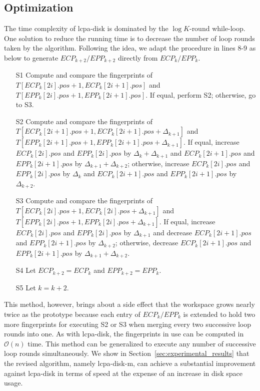 \documentclass[10pt,journal,compsoc]{IEEEtran}
\begin{document}
\begin{CJK*}{GBK}{song}
\subsection{Optimization}\label{subsec:optimization}
The time complexity of lcpa-disk is dominated by the $\log K$-round while-loop. One solution to reduce the running time is to decrease the number of loop rounds taken by the algorithm. Following the idea, we adapt the procedure in lines 8-9 as below to generate $ECP_{k+2}/EPP_{k+2}$ directly from $ECP_k/EPP_k$.

\begin{enumerate}
\item[S1] Compute and compare the fingerprints of $T[ECP_k[2i].pos+1,ECP_k[2i+1].pos]$ and $T[EPP_k[2i].pos+1,EPP_k[2i+1].pos]$. If equal, perform S2; otherwise, go to S3.
\item[S2] Compute and compare the fingerprints of $T[ECP_k[2i+1].pos+1,ECP_k[2i+1].pos+\Delta_{k+1}]$ and $T[EPP_k[2i+1].pos+1,EPP_k[2i+1].pos+\Delta_{k+1}]$. If equal, increase $ECP_k[2i].pos$ and $EPP_k[2i].pos$ by $\Delta_{k}+\Delta_{k+1}$ and $ECP_k[2i+1].pos$ and $EPP_k[2i+1].pos$ by $\Delta_{k+1}+\Delta_{k+2}$; otherwise, increase $ECP_k[2i].pos$ and $EPP_k[2i].pos$ by $\Delta_{k}$ and $ECP_k[2i+1].pos$ and $EPP_k[2i+1].pos$ by $\Delta_{k+2}$.
\item[S3] Compute and compare the fingerprints of $T[ECP_k[2i].pos+1,ECP_k[2i].pos+\Delta_{k+1}]$ and $T[EPP_k[2i].pos+1,EPP_k[2i].pos+\Delta_{k+1}]$. If equal, increase $ECP_k[2i].pos$ and $EPP_k[2i].pos$ by $\Delta_{k+1}$ and decrease $ECP_k[2i+1].pos$ and $EPP_k[2i+1].pos$ by $\Delta_{k+2}$; otherwise, decrease $ECP_k[2i+1].pos$ and $EPP_k[2i+1].pos$ by $\Delta_{k+1}+\Delta_{k+2}$.
\item[S4] Let $ECP_{k+2}=ECP_{k}$ and $EPP_{k+2}=EPP_{k}$.
\item[S5] Let $k = k+2$.
\end{enumerate}

This method, however, brings about a side effect that the workspace grows nearly twice as the prototype because each entry of $ECP_k/EPP_k$ is extended to hold two more fingerprints for executing S2 or S3 when merging every two successive loop rounds into one. As with lcpa-disk, the fingerprints in use can be computed in $\mathcal{O}(n)$ time. This method can be generalized to execute any number of successive loop rounds simultaneously. We show in Section~\ref{sec:experimental_results} that the revised algorithm, namely lcpa-disk-m, can achieve a substantial improvement against lcpa-disk in terms of speed at the expense of an increase in disk space usage.


\end{CJK*}
\end{document}
